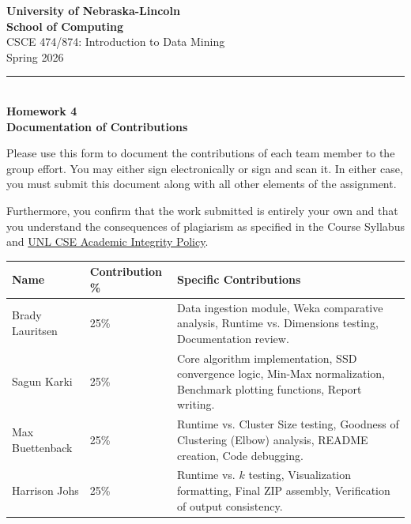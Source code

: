 \documentclass[12pt]{article}
\begin{document}
\begin{center}
  {\Huge \color{unlred} \textbf{University of Nebraska-Lincoln}} \\
  {\huge \color{unlred} \textbf{School of Computing}} \\
  \vspace{0.5cm}
  {\Large CSCE 474/874: Introduction to Data Mining} \\
  {\Large Spring 2026} \\
  \vspace{0.3cm}
  \rule{\textwidth}{0.8pt} \\
  \vspace{0.3cm}
  {\huge \textbf{Homework 4}} \\
  {\large \textbf{Documentation of Contributions}} \\
\end{center}

\vspace{0.5cm}

Please use this form to document the contributions of each team member to the group effort.   You may either sign electronically or sign and scan it.  In either case, you must submit this document along with all other elements of the assignment.

Furthermore, you confirm that the work submitted is entirely your own and that you understand the consequences of plagiarism as specified in the Course Syllabus and \href{http://cse.unl.edu/academic-integrity-policy}{UNL CSE Academic Integrity Policy}.

\vspace{0.8cm}

\noindent
\begin{tabular}{|p{}|p{}|p{}|}
  \hline
  \textbf{\color{unlred}Name} & \textbf{\color{unlred}Contribution \%} & \textbf{\color{unlred}Specific Contributions}                                                                              \\ \hline
  Brady Lauritsen             & 25\%                                   & Data ingestion module, Weka comparative analysis, Runtime vs. Dimensions testing, Documentation review.                    \\[1.2cm] \hline
  Sagun Karki                 & 25\%                                   & Core algorithm implementation, SSD convergence logic, Min-Max normalization, Benchmark plotting functions, Report writing. \\[1.2cm] \hline
  Max Buettenback             & 25\%                                   & Runtime vs. Cluster Size testing, Goodness of Clustering (Elbow) analysis, README creation, Code debugging.                \\[1.2cm] \hline
  Harrison Johs               & 25\%                                   & Runtime vs. $k$ testing, Visualization formatting, Final ZIP assembly, Verification of output consistency.                 \\[1.2cm] \hline
\end{tabular}
\end{document}
